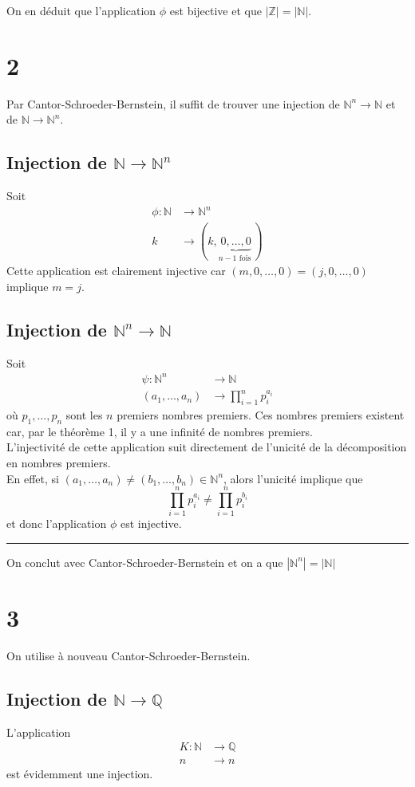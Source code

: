 \documentclass[11pt, a4paper]{article}
\newcommand\hr{
    \noindent\rule[0.5ex]{\linewidth}{0.5pt}\newline
}
\begin{document}
On en déduit que l'application $\phi$ est bijective et que $|\mathbb{Z}| = |\mathbb{N}|$.
\section*{2}
Par Cantor-Schroeder-Bernstein, il suffit de trouver une injection de $ \mathbb{N}^{n} \to \mathbb{N}$
et de $\mathbb{N} \to \mathbb{N}^{n}$.\\
\subsection*{ Injection de $\mathbb{N} \to \mathbb{N}^{n}$}
Soit 
 \begin{align*}
	 \phi: \mathbb{N} &\to \mathbb{N}^{n}\\ 
	 k &\to (k, \underbrace{0, \ldots, 0}_{n-1 \text{ fois } })
\end{align*}
Cette application est clairement injective car $ ( m, 0, \ldots, 0) = (j, 0, \ldots, 0)$ implique $m=j$.
\subsection*{Injection de $ \mathbb{N}^{n} \to \mathbb{N}$}
Soit
\begin{align*}
	\psi: \mathbb{N}^{n} &\to \mathbb{N}\\
	( a_1, \ldots, a_n) & \to \prod_{i=1} ^{n} p_{i} ^{a_i}
\end{align*}
où $ p_1, \ldots, p_n$ sont les $n$ premiers nombres premiers. Ces nombres premiers existent car, par le théorème 1, il y a une infinité de nombres premiers.\\
L'injectivité de cette application suit directement de l'unicité de la décomposition en nombres premiers.\\
En effet, si $ (a_1, \ldots, a_n) \neq ( b_1, \ldots ,b_n) \in \mathbb{N}^{n}$, alors l'unicité implique que
\[ 
\prod_{i=1} ^{n} p_i^{a_i} \neq \prod_{i=1} ^{n}p_i^{b_i}
\]
et donc l'application $\phi$ est injective.\\
\hr
On conclut avec Cantor-Schroeder-Bernstein et on a que $ |\mathbb{N}^{n}| = | \mathbb{N}|$
\section*{3}
On utilise à nouveau Cantor-Schroeder-Bernstein.\\
\subsection*{Injection de $\mathbb{N} \to \mathbb{Q}$}
L'application
\begin{align*}
	K: \mathbb{N} &\to \mathbb{Q}\\
	 n &\to n
\end{align*}
est évidemment une injection.\\
\end{document}
